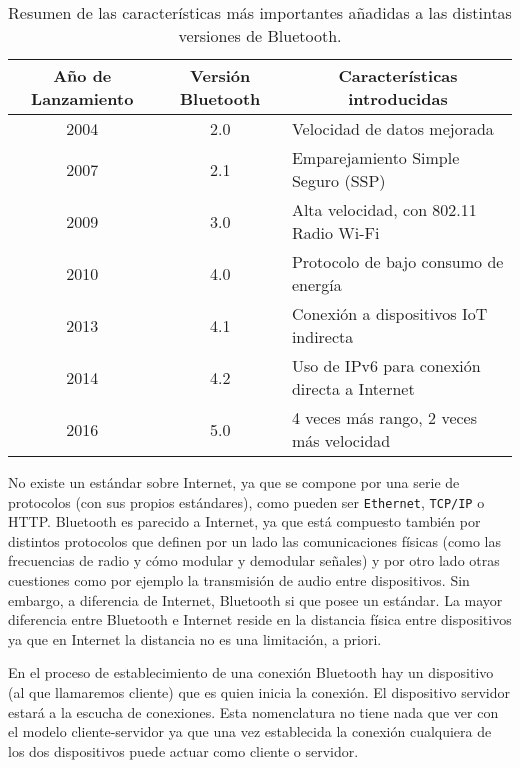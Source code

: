 \begin{table}[!h]
\centering
\begin{tabular}{|c|c|l|}
\hline
Año de Lanzamiento & Versión Bluetooth & \multicolumn{1}{c|}{Características introducidas}           \\ \hline
2004               & 2.0               & Velocidad de datos mejorada                                 \\ \hline
2007               & 2.1               & Emparejamiento Simple Seguro (\ac{SSP})    				 \\ \hline
2009               & 3.0               & Alta velocidad, con 802.11 Radio Wi-Fi                      \\ \hline
2010               & 4.0               & Protocolo de bajo consumo de energía                        \\ \hline
2013               & 4.1               & Conexión a dispositivos \ac{IoT} indirecta 				 \\ \hline
2014               & 4.2               & Uso de IPv6 para conexión directa a Internet                \\ \hline
2016               & 5.0               & 4 veces más rango, 2 veces más velocidad                    \\ \hline
\end{tabular}
\caption{Resumen de las características más importantes añadidas a las distintas versiones de Bluetooth.}
\label{table:bt_versions}
\end{table}

No existe un estándar sobre Internet, ya que se compone por una serie de protocolos (con sus propios estándares), como pueden ser \texttt{Ethernet}, \texttt{TCP/IP} o \ac{HTTP}. Bluetooth es parecido a Internet, ya que está compuesto también por distintos protocolos que definen por un lado las comunicaciones físicas (como las frecuencias de radio y cómo modular y demodular señales) y por otro lado otras cuestiones como por ejemplo la transmisión de audio entre dispositivos. Sin embargo, a diferencia de Internet, Bluetooth si que posee un estándar. La mayor diferencia entre Bluetooth e Internet reside en la distancia física entre dispositivos ya que en Internet la distancia no es una limitación, a priori.

En el proceso de establecimiento de una conexión Bluetooth hay un dispositivo (al que llamaremos cliente) que es quien inicia la conexión. El dispositivo servidor estará a la escucha de conexiones. Esta nomenclatura no tiene nada que ver con el modelo cliente-servidor ya que una vez establecida la conexión cualquiera de los dos dispositivos puede actuar como cliente o servidor.


